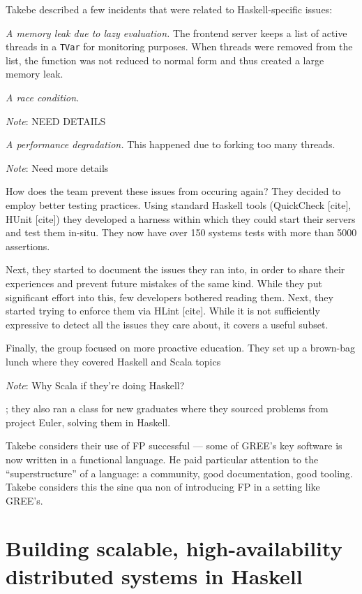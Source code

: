 \documentclass{jfp1}
\newenvironment{ipar}[0]%
 {\begin{list}{}%
 {\setlength{\leftmargin}{1cm}}%
\item[]%
 }
 {\end{list}}
\newcommand\needcite{{\color{red} [cite]}\xspace}
\newcommand{\note}[1]{ \begin{ipar}  {\color{Gray} \textit{Note}: #1} \end{ipar}}
\begin{document}
Takebe described a few incidents that were related to Haskell-specific
issues:

\begin{itemize}

\item \textit{A memory leak due to lazy evaluation.} The frontend server
keeps a list of active threads in a \texttt{TVar} for monitoring purposes.
When threads were removed from the list, the function was not reduced
to normal form and thus created a large memory leak.

\item \textit{A race condition.} \note{NEED DETAILS}

\item \textit{A performance degradation.} This happened due to forking
too many threads. \note{Need more details}

\end{itemize}

How does the team prevent these issues from occuring again? They
decided to employ better testing practices. Using standard Haskell
tools (QuickCheck\needcite, HUnit\needcite) they developed a 
harness within which they could start their servers and test them 
in-situ. They now have over 150 systems tests with more than 
5000 assertions.

Next, they started to document the issues they ran into, in order to 
share their experiences and prevent future mistakes of the same kind.
While they put significant effort into this, few developers bothered reading
them. Next, they started trying to enforce them via HLint\needcite. While
it is not sufficiently expressive to detect all the issues they care about, 
it covers a useful subset.

Finally, the group focused on more proactive education. They set up a
brown-bag lunch where they covered Haskell and Scala topics \note{Why
  Scala if they're doing Haskell?}; they also
ran a class for new graduates where they sourced problems from project
Euler, solving them in Haskell.

Takebe considers their use of FP successful --- some of GREE's key
software is now written in a functional language. He paid particular
attention to the ``superstructure'' of a language: a community, good
documentation, good tooling. Takebe considers this the sine qua non
of introducing FP in a setting like GREE's.

\section{Building scalable, high-availability distributed systems in Haskell}
\end{document}
